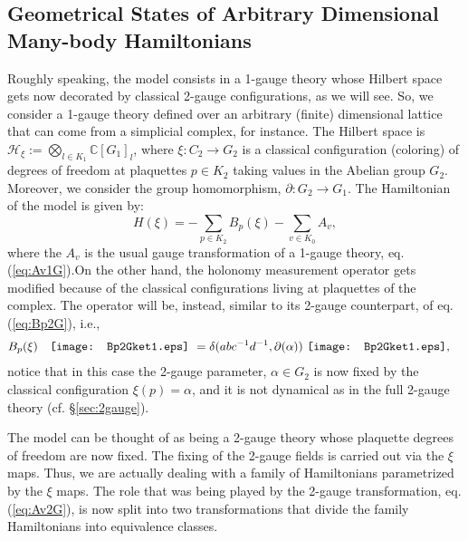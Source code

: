\documentclass[titlepage,11pt]{article}
\theoremstyle{plain}%
\theoremstyle{definition}
\theoremstyle{remark}
\begin{document}
\subsection{Geometrical States of Arbitrary Dimensional Many-body Hamiltonians}\label{sec:2.1}

Roughly speaking, the model consists in a 1-gauge theory whose Hilbert space gets now decorated by classical 2-gauge configurations, as we will see. So, we consider a 1-gauge theory defined over an arbitrary (finite) dimensional lattice that can come from a simplicial complex, for instance. The Hilbert space is $\mathcal{H}_\xi :=\bigotimes_{l \in K_1} \mathbb{C}[G_1]_l$, where $\xi: C_2 \rightarrow  G_2$ is a classical configuration (coloring) of degrees of freedom at plaquettes $p \in K_2$ taking values in the Abelian group $G_2$. Moreover, we consider the group homomorphism, $\partial: G_2 \rightarrow G_1$.
The Hamiltonian of the model is given by:
\begin{equation}\label{eq:Hgeo}
H(\xi) = - \sum_{p\in K_2} B_p(\xi) - \sum_{v \in K_0} A_v,
\end{equation}
where the $A_v$ is the usual gauge transformation of a 1-gauge theory, eq. (\ref{eq:Av1G}).On the other hand, the holonomy measurement operator gets modified because of the classical configurations living at plaquettes of the complex. The operator will be, instead, similar to its 2-gauge counterpart, of eq. (\ref{eq:Bp2G}), i.e.,
\begin{align}\label{eq:Bp2G}
 B_p(\xi) \quad \vcenter{\hbox{\texttt{[image: Bp2Gket1.eps]}}}\ &= \delta(abc^{-1}d^{-1},\partial(\alpha))\ \vcenter{\hbox{\texttt{[image: Bp2Gket1.eps]}}},
\end{align}
notice that in this case the 2-gauge parameter, $\alpha \in G_2$ is now fixed by the classical configuration $\xi(p)=\alpha$, and it is not dynamical as in the full 2-gauge theory (cf. \S \ref{sec:2gauge}). 

The model can be thought of as being a 2-gauge theory whose plaquette degrees of freedom are now fixed. The fixing of the 2-gauge fields is carried out via the $\xi$ maps. Thus, we are actually dealing with a family of Hamiltonians parametrized by the $\xi$ maps. The role that was being played by the 2-gauge transformation, eq. (\ref{eq:Av2G}), is now split into two transformations that divide the family Hamiltonians into equivalence classes. 
\end{document}
